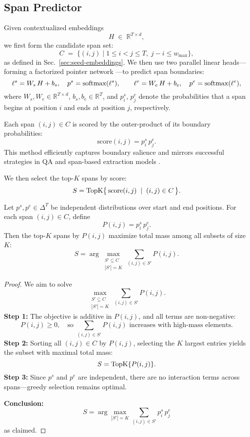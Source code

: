 \subsection{Span Predictor}
\label{sec:span-predictor}

Given contextualized embeddings 
\[
H \;\in\;\mathbb{R}^{T\times d},
\]
we first form the candidate span set:
\[
C \;=\;\{(i,j)\mid 1 \le i < j \le T,\; j - i \le w_{\max}\},
\]
as defined in Sec.~\ref{sec:seed-embeddings}. We then use two parallel linear heads—forming a factorized pointer network \cite{vinyals2015pointer}—to predict span boundaries:
\[
\ell^s = W_s\,H + b_s,
\quad
p^s = \mathrm{softmax}(\ell^s),
\qquad
\ell^e = W_e\,H + b_e,
\quad
p^e = \mathrm{softmax}(\ell^e),
\]
where \(W_s,W_e\in\mathbb{R}^{T\times d}\), \(b_s,b_e\in\mathbb{R}^T\), and \(p^s_i\), \(p^e_j\) denote the probabilities that a span begins at position \(i\) and ends at position \(j\), respectively.

Each span \((i,j)\in C\) is scored by the outer-product of its boundary probabilities:
\[
\mathrm{score}(i,j) = p^s_i\,p^e_j.
\]
This method efficiently captures boundary salience and mirrors successful strategies in QA and span-based extraction models \cite{lee2016learning,xu2022faster}.

We then select the top-\(K\) spans by score:
\[
S = \operatorname{TopK}\bigl\{\,\mathrm{score}(i,j)\;\mid\;(i,j)\in C\,\bigr\}.
\]

\begin{proposition}
	\label{prop:topk-marginal}
	Let \(p^s,p^e\in\Delta^T\) be independent distributions over start and end positions. For each span \((i,j)\in C\), define
	\[
	P(i,j) = p^s_i\,p^e_j.
	\]
	Then the top-\(K\) spans by \(P(i,j)\) maximize total mass among all subsets of size \(K\):
	\[
	S 
	= \arg\max_{\substack{S'\subseteq C\\|S'|=K}} \sum_{(i,j)\in S'} P(i,j).
	\]
\end{proposition}

\begin{proof}
	We aim to solve
	\[
	\max_{\substack{S'\subseteq C\\|S'|=K}} \sum_{(i,j)\in S'} P(i,j).
	\]
	\textbf{Step 1:} The objective is additive in \(P(i,j)\), and all terms are non-negative:
	\[
	P(i,j)\ge0,\quad \text{so } \sum_{(i,j)\in S'} P(i,j) \text{ increases with high-mass elements}.
	\]
	\textbf{Step 2:} Sorting all \((i,j)\in C\) by \(P(i,j)\), selecting the \(K\) largest entries yields the subset with maximal total mass:
	\[
	S = \operatorname{TopK}\{P(i,j)\}.
	\]
	\textbf{Step 3:} Since \(p^s\) and \(p^e\) are independent, there are no interaction terms across spans—greedy selection remains optimal.
	
	\textbf{Conclusion:}
	\[
	\boxed{
		S = \arg\max_{|S'|=K} \sum_{(i,j)\in S'} p^s_i\,p^e_j
	}
	\]
	as claimed.
\end{proof}